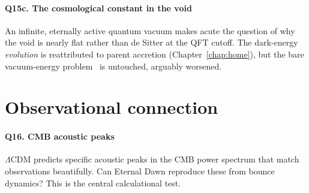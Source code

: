 \paragraph{Q15c. The cosmological constant in the void}
An infinite, eternally active quantum vacuum makes acute the question of why the
void is nearly flat rather than de Sitter at the QFT cutoff. The dark-energy
\emph{evolution} is reattributed to parent accretion (Chapter~\ref{chap:home}),
but the bare vacuum-energy problem~\citep{weinberg1989} is untouched, arguably
worsened.

\section{Observational connection}

\paragraph{Q16. CMB acoustic peaks}
$\Lambda$CDM predicts specific acoustic peaks in the CMB power spectrum that
match observations beautifully. Can Eternal Dawn reproduce these from bounce dynamics?
This is the central calculational test.

